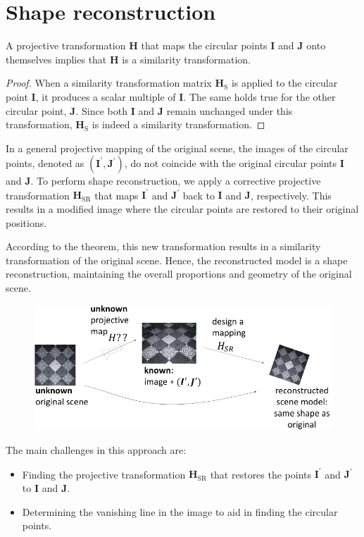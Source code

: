 \section{Shape reconstruction}

\begin{theorem}
    A projective transformation $\mathbf{H}$ that maps the circular points $\mathbf{I}$ and $\mathbf{J}$ onto themselves implies that $\mathbf{H}$ is a similarity transformation.
\end{theorem}
\begin{proof}
    When a similarity transformation matrix $\mathbf{H}_\text{S}$ is applied to the circular point $\mathbf{I}$, it produces a scalar multiple of $\mathbf{I}$.
    The same holds true for the other circular point, $\mathbf{J}$.
    Since both $\mathbf{I}$ and $\mathbf{J}$ remain unchanged under this transformation, $\mathbf{H}_\text{S}$ is indeed a similarity transformation.
\end{proof}
In a general projective mapping of the original scene, the images of the circular points, denoted as $(\mathbf{I}^\prime,\mathbf{J}^\prime)$, do not coincide with the original circular points $\mathbf{I}$ and $\mathbf{J}$. 
To perform shape reconstruction, we apply a corrective projective transformation $\mathbf{H}_\text{SR}$ that maps $\mathbf{I}^\prime$ and $\mathbf{J}^\prime$ back to $\mathbf{I}$ and $\mathbf{J}$, respectively. 
This results in a modified image where the circular points are restored to their original positions.

According to the theorem, this new transformation results in a similarity transformation of the original scene. 
Hence, the reconstructed model is a shape reconstruction, maintaining the overall proportions and geometry of the original scene.
\begin{figure}[H]
    \centering
    \includegraphics[width=0.75\linewidth]{images/HSR.png}
\end{figure}
The main challenges in this approach are:
\begin{itemize}
    \item Finding the projective transformation $\mathbf{H}_\text{SR}$ that restores the points $\mathbf{I}^\prime$ and $\mathbf{J}^\prime$ to $\mathbf{I}$ and $\mathbf{J}$. 
    \item Determining the vanishing line in the image to aid in finding the circular points.
\end{itemize}

